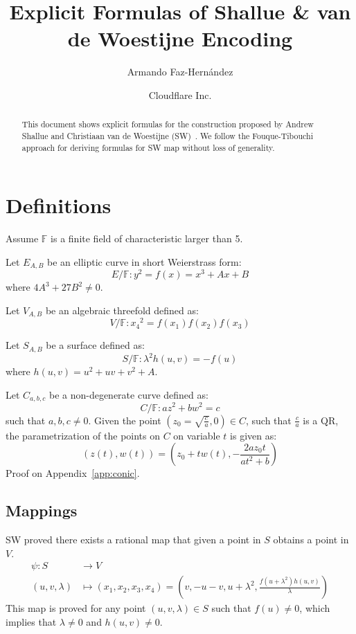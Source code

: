 \documentclass[letterpaper,11pt]{article}
\author{Armando Faz-Hern\'andez}
\title{Explicit Formulas of Shallue \& van de Woestijne Encoding}
\date{Cloudflare Inc.}
\begin{document}
\maketitle
\begin{abstract}
 This document shows explicit formulas for the construction proposed by Andrew Shallue and Christiaan van de Woestijne (SW)~\cite{SW}. We follow the Fouque-Tibouchi~\cite{ft2012} approach for deriving formulas for SW map without loss of generality.
\end{abstract}

\section{Definitions}
Assume $\mathbb{F}$ is a finite field of characteristic larger than 5.

Let $E_{A,B}$ be an elliptic curve in short Weierstrass form:
\begin{equation}
  E/\mathbb{F} \colon y^2 = f(x)= x^3+Ax+B 
\end{equation}
where $4A^3+27B^2\neq 0$.

Let $V_{A,B}$ be an algebraic threefold defined as:
\begin{equation}
 V/\mathbb{F} \colon {x_4}^2 =  f(x_1) f(x_2) f(x_3)
\end{equation}

Let $S_{A,B}$ be a surface defined as:
\begin{equation}
 S/\mathbb{F} \colon \lambda^2 h(u,v)= -f(u)
\end{equation}
where $h(u,v) = u^2+uv+v^2+A$.


Let $C_{a,b,c}$ be a non-degenerate curve defined as:
\begin{equation}
 C/\mathbb{F} \colon az^2+bw^2=c
\end{equation}
such that $a,b,c\neq 0$. Given the point $(z_0=\sqrt{\frac{c}{a}},0)\in C$, such that $\frac{c}{a}$ is a QR, the parametrization of the points on $C$ on variable $t$ is given as:
\begin{equation}
(z(t),w(t)) = \left( z_0+tw(t),-\dfrac{2az_0t}{at^2+b} \right) 
\end{equation}
Proof on Appendix~\ref{app:conic}.

\subsection{Mappings}

SW proved there exists a rational map that given a point in $S$ obtains a point in $V$.
\begin{equation}
 \begin{aligned}
  \psi \colon S &\rightarrow V\\
   (u,v,\lambda) &\mapsto (x_1,x_2,x_3,x_4)
                 = \left(v , -u-v, u+\lambda^2, \frac{f(u+\lambda^ 2)h(u,v)}{\lambda}\right)
 \end{aligned}
\end{equation}
This map is proved for any point $(u,v,\lambda)\in S$ such that $f(u)\neq 0$, which implies that $\lambda\neq 0$ and $h(u,v)\neq 0$.
\end{document}
